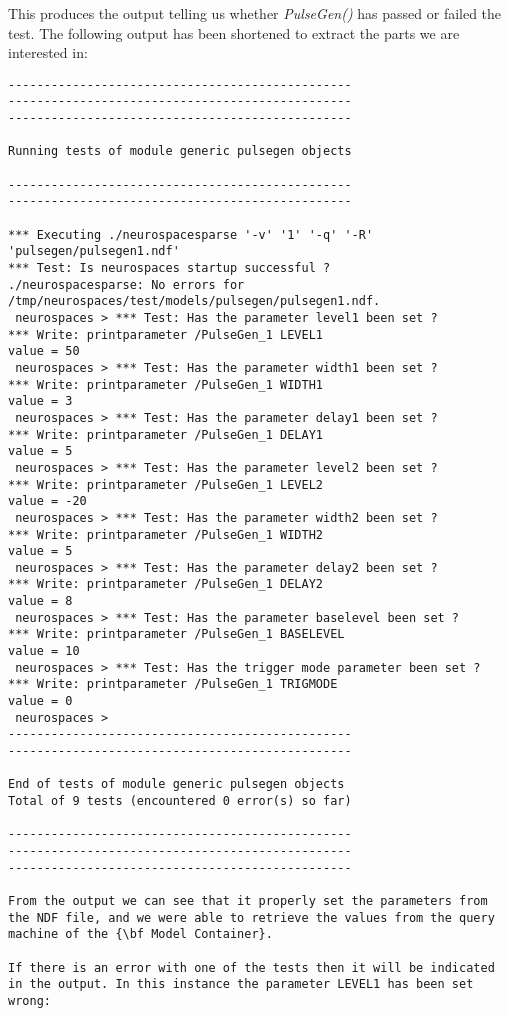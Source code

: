 \documentclass[12pt]{article}
\begin{document}
This produces the output telling us whether {\it PulseGen()} has passed or failed the test. The following output has been shortened to extract the parts we are interested in:
\begin{verbatim}
------------------------------------------------
------------------------------------------------
------------------------------------------------

Running tests of module generic pulsegen objects

------------------------------------------------
------------------------------------------------

*** Executing ./neurospacesparse '-v' '1' '-q' '-R' 'pulsegen/pulsegen1.ndf'
*** Test: Is neurospaces startup successful ?
./neurospacesparse: No errors for /tmp/neurospaces/test/models/pulsegen/pulsegen1.ndf.
 neurospaces > *** Test: Has the parameter level1 been set ?
*** Write: printparameter /PulseGen_1 LEVEL1
value = 50
 neurospaces > *** Test: Has the parameter width1 been set ?
*** Write: printparameter /PulseGen_1 WIDTH1
value = 3
 neurospaces > *** Test: Has the parameter delay1 been set ?
*** Write: printparameter /PulseGen_1 DELAY1
value = 5
 neurospaces > *** Test: Has the parameter level2 been set ?
*** Write: printparameter /PulseGen_1 LEVEL2
value = -20
 neurospaces > *** Test: Has the parameter width2 been set ?
*** Write: printparameter /PulseGen_1 WIDTH2
value = 5
 neurospaces > *** Test: Has the parameter delay2 been set ?
*** Write: printparameter /PulseGen_1 DELAY2
value = 8
 neurospaces > *** Test: Has the parameter baselevel been set ?
*** Write: printparameter /PulseGen_1 BASELEVEL
value = 10
 neurospaces > *** Test: Has the trigger mode parameter been set ?
*** Write: printparameter /PulseGen_1 TRIGMODE
value = 0
 neurospaces > 
------------------------------------------------
------------------------------------------------

End of tests of module generic pulsegen objects
Total of 9 tests (encountered 0 error(s) so far)

------------------------------------------------
------------------------------------------------
------------------------------------------------

From the output we can see that it properly set the parameters from the NDF file, and we were able to retrieve the values from the query machine of the {\bf Model Container}.

If there is an error with one of the tests then it will be indicated in the output. In this instance the parameter LEVEL1 has been set wrong:


\end{verbatim}
\end{document}
